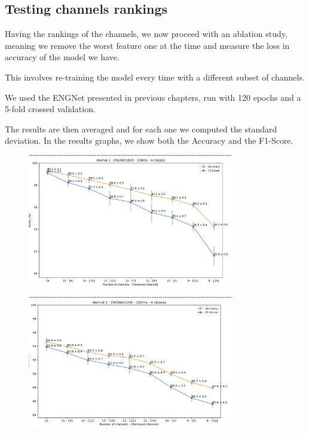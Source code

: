 \documentclass{Configuration_Files/PoliMi3i_thesis}
\begin{document}
\subsection{Testing channels rankings}

Having the rankings of the channels, we now proceed with an ablation study, meaning we remove the worst feature one at the time and measure the loss in accuracy of the model we have.

This involves re-training the model every time with a different subset of channels.

We used the ENGNet presented in previous chapters, run with 120 epochs and a 5-fold crossed validation.

The results are then averaged and for each one we computed the standard deviation.
In the results graphs, we show both the Accuracy and the F1-Score.


\begin{figure}[H]
    \centering
    \includegraphics[width=0.8\textwidth]{Results Matteo/figure2}
    \label{fig:figure1}
\end{figure}

\begin{figure}[H]
    \centering
    \includegraphics[width=0.8\textwidth]{Results Matteo/figure3}
    \label{fig:figure1}
\end{figure}
\end{document}
